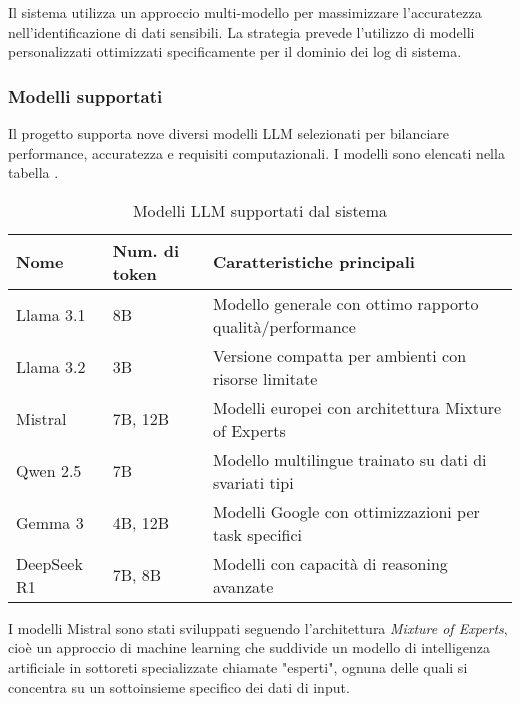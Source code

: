 \documentclass[12pt]{report}
\begin{document}
Il sistema utilizza un approccio multi-modello per massimizzare l'accuratezza nell'identificazione di dati sensibili. La strategia prevede l'utilizzo di modelli personalizzati ottimizzati specificamente per il dominio dei log di sistema.

\subsubsection{Modelli supportati}
Il progetto supporta nove diversi modelli LLM selezionati per bilanciare performance, accuratezza e requisiti computazionali. I modelli sono elencati nella tabella .

\begin{table}[h!]
    \centering
    \begin{tabular}{|p{}|p{}|p{}|}
        \hline
        \textbf{Nome} & \textbf{Num. di token} & \textbf{Caratteristiche principali}                  \\ \hline
        Llama 3.1     & 8B                     & Modello generale con ottimo rapporto qualità/performance   \\ \hline
        Llama 3.2     & 3B                     & Versione compatta per ambienti con risorse limitate  \\ \hline
        Mistral       & 7B, 12B                & Modelli europei con architettura Mixture of Experts  \\ \hline
        Qwen 2.5      & 7B                     & Modello multilingue trainato su dati di svariati tipi \\ \hline
        Gemma 3       & 4B, 12B                & Modelli Google con ottimizzazioni per task specifici \\ \hline
        DeepSeek R1   & 7B, 8B                 & Modelli con capacità di reasoning avanzate           \\ \hline
    \end{tabular}
    \caption{Modelli LLM supportati dal sistema}
    \label{tab:modelli_llm}
\end{table}

I modelli Mistral sono stati sviluppati seguendo l'architettura \textit{Mixture of Experts}, cioè un approccio di machine learning che suddivide un modello di intelligenza artificiale in sottoreti specializzate chiamate "esperti", ognuna delle quali si concentra su un sottoinsieme specifico dei dati di input.~\cite{mu2025moe_survey}~\cite{ibm_moe}
\end{document}
